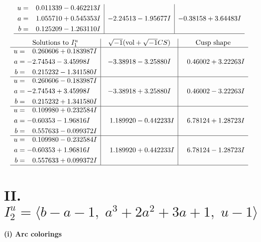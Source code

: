 \documentclass[1p]{elsarticle_modified}
\theoremstyle{definition}
\newcommand{\I}{\sqrt{-1}}
\begin{document}
$$\begin{array}{c|c|c}
\begin{aligned}
u &= \phantom{-}0.011339 - 0.462213 I \\
a &= \phantom{-}1.055710 + 0.545353 I \\
b &= \phantom{-}0.125209 - 1.263110 I\end{aligned}
 & -2.24513 - 1.95677 I & -0.38158 + 3.64483 I\\
 \hline 
 \end{array}$$\newpage$$\begin{array}{c|c|c}  
\text{Solutions to }I^u_{1}& \I (\text{vol} + \sqrt{-1}CS) & \text{Cusp shape}\\
 \hline 
\begin{aligned}
u &= \phantom{-}0.260606 + 0.183987 I \\
a &= -2.74543 - 3.45998 I \\
b &= \phantom{-}0.215232 - 1.341580 I\end{aligned}
 & -3.38918 - 3.25880 I & \phantom{-}0.46002 + 3.22263 I \\ \hline\begin{aligned}
u &= \phantom{-}0.260606 - 0.183987 I \\
a &= -2.74543 + 3.45998 I \\
b &= \phantom{-}0.215232 + 1.341580 I\end{aligned}
 & -3.38918 + 3.25880 I & \phantom{-}0.46002 - 3.22263 I \\ \hline\begin{aligned}
u &= \phantom{-}0.109980 + 0.232584 I \\
a &= -0.60353 - 1.96816 I \\
b &= \phantom{-}0.557633 - 0.099372 I\end{aligned}
 & \phantom{-}1.189920 - 0.442233 I & \phantom{-}6.78124 + 1.28723 I \\ \hline\begin{aligned}
u &= \phantom{-}0.109980 - 0.232584 I \\
a &= -0.60353 + 1.96816 I \\
b &= \phantom{-}0.557633 + 0.099372 I\end{aligned}
 & \phantom{-}1.189920 + 0.442233 I & \phantom{-}6.78124 - 1.28723 I\\
 \hline 
 \end{array}$$\newpage\newpage\renewcommand{\arraystretch}{1}
\centering \section*{II. $I^u_{2}= \langle b- a-1,\;a^3+2 a^2+3 a+1,\;u-1 \rangle$}
\flushleft \textbf{(i) Arc colorings}\\
\end{document}
